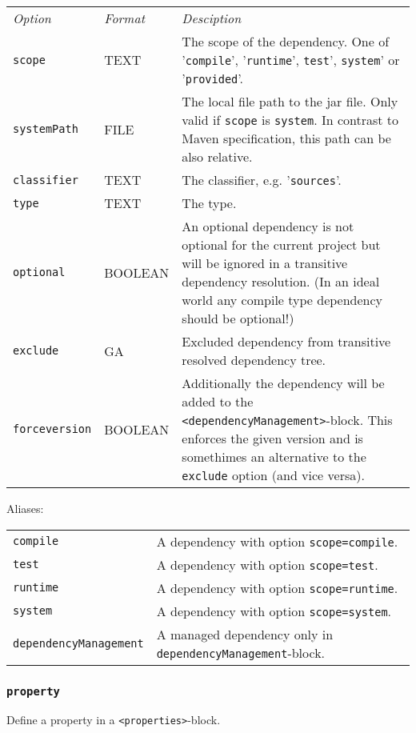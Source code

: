 \documentclass[a4paper,12pt,english,oneside,halfparskip]{scrartcl}
\newcommand{\code}[1]{\texttt{#1}}
\begin{document}
\begin{tabular}{llp{}}
\emph{Option} & \emph{Format} & \emph{Desciption} \\
\code{scope} & TEXT & The scope of the dependency. One of '\code{compile}', '\code{runtime}', \code{test}', \code{system}' or '\code{provided}'. \\
\code{systemPath} & FILE & The local file path to the jar file. Only valid if \code{scope} is \code{system}. In contrast to Maven specification, this path can be also relative. \\
\code{classifier} & TEXT & The classifier, e.g. '\code{sources}'. \\
\code{type} & TEXT &  The type. \\
\code{optional} & BOOLEAN & An optional dependency is not optional for the current project but will be ignored in a transitive dependency resolution. (In an ideal world any compile type dependency should be optional!) \\
\code{exclude} & GA & Excluded dependency from transitive resolved dependency tree. \\
\code{forceversion} & BOOLEAN & Additionally the dependency will be added to the \code{<dependencyManagement>}-block. This enforces the given version and is somethimes an alternative to the \code{exclude} option (and vice versa). \\
\end{tabular}

Aliases:

\begin{tabular}{ll}
\code{compile} &  A dependency with option \code{scope=compile}. \\
\code{test} & A dependency with option \code{scope=test}. \\
\code{runtime} & A dependency with option \code{scope=runtime}. \\
\code{system} & A dependency with option \code{scope=system}. \\
\code{\small dependencyManagement} &  A managed dependency only in \code{dependencyManagement}-block. \\
\end{tabular}



\subsubsection{\code{property}}

Define a property in a \code{<properties>}-block.
\end{document}

